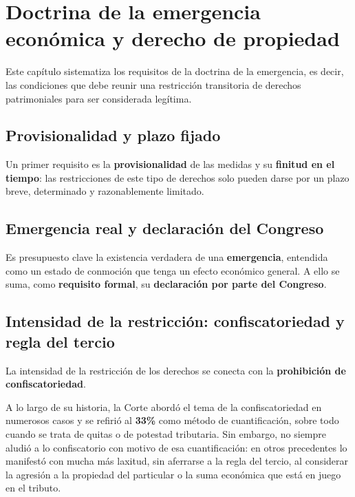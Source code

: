 \documentclass[12pt,oneside]{book}
\begin{document}
\chapter[Doctrina de la emergencia]{Doctrina de la emergencia económica y derecho de propiedad}

Este capítulo sistematiza los requisitos de la doctrina de la emergencia, es decir, las condiciones que debe reunir una restricción transitoria de derechos patrimoniales para ser considerada legítima.

\section{Provisionalidad y plazo fijado}

Un primer requisito es la \textbf{provisionalidad} de las medidas y su \textbf{finitud en el tiempo}: las restricciones de este tipo de derechos solo pueden darse por un plazo breve, determinado y razonablemente limitado.

\section{Emergencia real y declaración del Congreso}

Es presupuesto clave la existencia verdadera de una \textbf{emergencia}, entendida como un estado de conmoción que tenga un efecto económico general. A ello se suma, como \textbf{requisito formal}, su \textbf{declaración por parte del Congreso}.

\section{Intensidad de la restricción: confiscatoriedad y regla del tercio}

La intensidad de la restricción de los derechos se conecta con la \textbf{prohibición de confiscatoriedad}.

A lo largo de su historia, la Corte abordó el tema de la confiscatoriedad en numerosos casos y se refirió al \textbf{33\%} como método de cuantificación, sobre todo cuando se trata de quitas o de potestad tributaria. Sin embargo, no siempre aludió a lo confiscatorio con motivo de esa cuantificación: en otros precedentes lo manifestó con mucha más laxitud, sin aferrarse a la regla del tercio, al considerar la agresión a la propiedad del particular o la suma económica que está en juego en el tributo.
\end{document}
